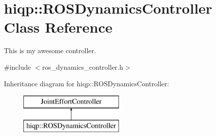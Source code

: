 \hypertarget{classhiqp_1_1ROSDynamicsController}{\section{hiqp\-:\-:R\-O\-S\-Dynamics\-Controller Class Reference}
\label{classhiqp_1_1ROSDynamicsController}
}


This is my awesome controller.  




{\ttfamily \#include $<$ros\-\_\-dynamics\-\_\-controller.\-h$>$}

Inheritance diagram for hiqp\-:\-:R\-O\-S\-Dynamics\-Controller\-:\begin{figure}[H]
\begin{center}
\leavevmode
\includegraphics[height=2.000000cm]{classhiqp_1_1ROSDynamicsController}
\end{center}
\end{figure}
